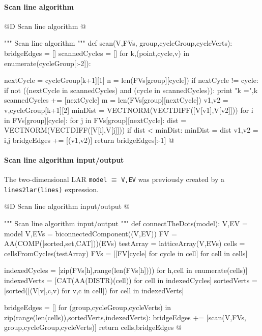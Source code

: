 \documentclass[11pt,oneside]{article}    %
\begin{document}
\paragraph{Scan line algorithm}
@D Scan line algorithm 
@{""" Scan line algorithm """
def scan(V,FVs, group,cycleGroup,cycleVerts):
    bridgeEdges = []
    scannedCycles = []
    for k,(point,cycle,v) in enumerate(cycleGroup[:-2]):
    	
        nextCycle = cycleGroup[k+1][1]
        n = len(FVs[group][cycle])
        if nextCycle != cycle: 
            if not ((nextCycle in scannedCycles) and (cycle in scannedCycles)):
                print "k =",k
                scannedCycles += [nextCycle]
                m = len(FVs[group][nextCycle])
                v1,v2 = v,cycleGroup[k+1][2]
                minDist = VECTNORM(VECTDIFF([V[v1],V[v2]]))
                for i in FVs[group][cycle]:
                    for j in FVs[group][nextCycle]:
                        dist = VECTNORM(VECTDIFF([V[i],V[j]]))
                        if  dist < minDist: 
                            minDist = dist
                            v1,v2 = i,j
                bridgeEdges += [(v1,v2)]
    return bridgeEdges[:-1]
@}

\paragraph{Scan line algorithm input/output}

The two-dimensional LAR \texttt{model} $\equiv$ \texttt{V,EV} was previously created by a \texttt{lines2lar(lines)} expression.

@D Scan line algorithm input/output
@{""" Scan line algorithm input/output """
def connectTheDots(model):
    V,EV = model
    V,EVs = biconnectedComponent((V,EV))
    FV = AA(COMP([sorted,set,CAT]))(EVs)
    testArray = latticeArray(V,EVs)
    cells = cellsFromCycles(testArray)
    FVs = [[FV[cycle] for cycle in cell] for cell in cells]
    
    indexedCycles = [zip(FVs[h],range(len(FVs[h])))   for h,cell in enumerate(cells)]
    indexedVerts = [CAT(AA(DISTR)(cell)) for cell in indexedCycles]
    sortedVerts = [sorted([(V[v],c,v) for v,c in cell]) for cell in indexedVerts]
    
    bridgeEdges = []
    for (group,cycleGroup,cycleVerts) in zip(range(len(cells)),sortedVerts,indexedVerts):
        bridgeEdges += [scan(V,FVs, group,cycleGroup,cycleVerts)]
    return cells,bridgeEdges
@}
\end{document}
